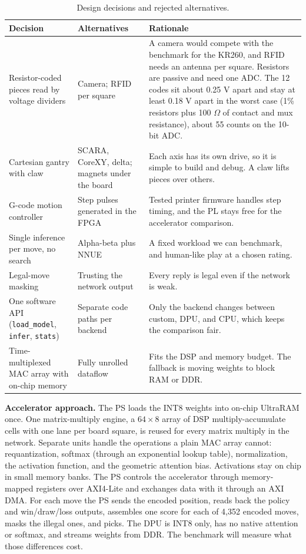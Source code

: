 \documentclass[10pt]{article}
\newcommand{\lead}[1]{\textbf{#1}}
\begin{document}
\begin{table}[H]
\centering\small
\caption{Design decisions and rejected alternatives.}\label{tab:dec}
\begin{tabularx}{\textwidth}{@{}P{2.7cm} P{3.0cm} L@{}}
\toprule
\textbf{Decision} & \textbf{Alternatives} & \textbf{Rationale} \\
\midrule
Resistor-coded pieces read by voltage dividers & Camera; RFID per square & A camera would compete with the benchmark for the KR260, and RFID needs an antenna per square. Resistors are passive and need one ADC. The 12 codes sit about 0.25 V apart and stay at least 0.18 V apart in the worst case (1\% resistors plus 100 $\Omega$ of contact and mux resistance), about 55 counts on the 10-bit ADC. \\
Cartesian gantry with claw & SCARA, CoreXY, delta; magnets under the board & Each axis has its own drive, so it is simple to build and debug. A claw lifts pieces over others. \\
G-code motion controller & Step pulses generated in the FPGA & Tested printer firmware handles step timing, and the PL stays free for the accelerator comparison. \\
Single inference per move, no search & Alpha-beta plus NNUE & A fixed workload we can benchmark, and human-like play at a chosen rating. \\
Legal-move masking & Trusting the network output & Every reply is legal even if the network is weak. \\
One software API (\texttt{load\_model}, \texttt{infer}, \texttt{stats}) & Separate code paths per backend & Only the backend changes between custom, DPU, and CPU, which keeps the comparison fair. \\
Time-multiplexed MAC array with on-chip memory & Fully unrolled dataflow & Fits the DSP and memory budget. The fallback is moving weights to block RAM or DDR. \\
\bottomrule
\end{tabularx}
\end{table}

\lead{Accelerator approach.} The PS loads the INT8 weights into on-chip UltraRAM once. One
matrix-multiply engine, a $64\times8$ array of DSP multiply-accumulate cells with one lane per
board square, is reused for every matrix multiply in the network. Separate units handle the
operations a plain MAC array cannot: requantization, softmax (through an exponential lookup table),
normalization, the activation function, and the geometric attention bias. Activations stay on chip
in small memory banks. The PS controls the accelerator through memory-mapped registers over
AXI4-Lite and exchanges data with it through an AXI DMA. For each move the PS sends the encoded
position, reads back the policy and win/draw/loss outputs, assembles one score for each of 4,352
encoded moves, masks the illegal ones, and picks. The DPU is INT8 only, has no native attention or
softmax, and streams weights from DDR. The benchmark will measure what those differences cost.
\end{document}
